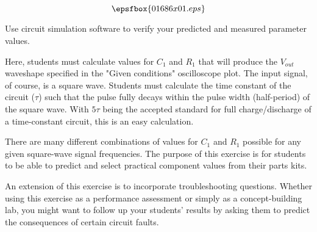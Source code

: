 

$$\epsfbox{01686x01.eps}$$

\vfil \eject






Use circuit simulation software to verify your predicted and measured parameter values.







Here, students must calculate values for $C_1$ and $R_1$ that will produce the $V_{out}$ waveshape specified in the "Given conditions" oscilloscope plot.  The input signal, of course, is a square wave.  Students must calculate the time constant of the circuit ($\tau$) such that the pulse fully decays within the pulse width (half-period) of the square wave.  With $5 \tau$ being the accepted standard for full charge/discharge of a time-constant circuit, this is an easy calculation.

There are many different combinations of values for $C_1$ and $R_1$ possible for any given square-wave signal frequencies.  The purpose of this exercise is for students to be able to predict and select practical component values from their parts kits.

An extension of this exercise is to incorporate troubleshooting questions.  Whether using this exercise as a performance assessment or simply as a concept-building lab, you might want to follow up your students' results by asking them to predict the consequences of certain circuit faults.




